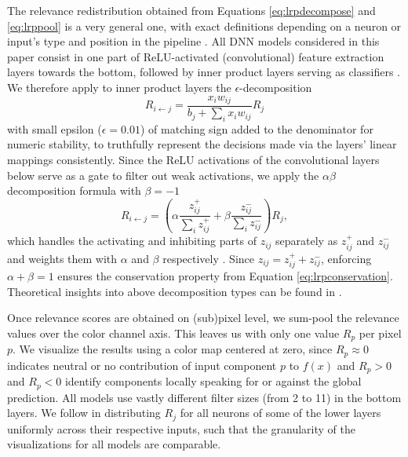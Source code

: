\documentclass[10pt,twocolumn,letterpaper]{article}
\begin{document}
The relevance redistribution obtained from Equations \ref{eq:lrpdecompose} and \ref{eq:lrppool} is a very general one, with exact definitions depending on a neuron or input's type and position in the pipeline \cite{lapuschkin2016analyzing}. All DNN models considered in this paper consist in one part of ReLU-activated (convolutional) feature extraction layers towards the bottom, followed by inner product layers serving as classifiers \cite{NIPS2010_4061}. We therefore apply to inner product layers the $\epsilon$-decomposition
\begin{equation}
R_{i\leftarrow j} = \frac{x_iw_{ij}}{b_j + \sum_i x_iw_{ij}} R_j
\end{equation}
with small epsilon ($\epsilon=0.01$) of matching sign added to the denominator for numeric stability, to truthfully represent the decisions made via the layers' linear mappings consistently. 
Since the ReLU activations of the convolutional layers below serve as a gate to filter out weak activations, we apply the $\alpha\beta$ decomposition formula with $\beta=-1$ \cite{bach2015pixel}
\begin{equation}
R_{i\leftarrow j} = \left(\alpha\frac{z^+_{ij}}{\sum_iz^+_{ij}} + \beta\frac{z^-_{ij}}{\sum_iz^-_{ij}}\right)R_j,
\end{equation}
which handles the activating and inhibiting parts of $z_{ij}$ separately as $z^+_{ij}$ and $z^-_{ij}$ and weights them with $\alpha$ and $\beta$ respectively \cite{bach2015pixel}. Since $z_{ij} = z^+_{ij} + z^-_{ij}$, enforcing $\alpha+\beta=1$ ensures the conservation property from Equation \ref{eq:lrpconservation}. Theoretical insights into above decomposition types can be found in \cite{MonPR17}.

Once relevance scores are obtained on (sub)pixel level, we sum-pool the relevance values over the color channel axis. This leaves us with only one value $R_p$ per pixel $p$. We visualize the results using a color map centered at zero, since $R_p \approx 0$ indicates neutral or no contribution of input component $p$ to $f(x)$ and $R_p > 0$ and $R_p < 0$ identify components locally speaking for or against the global prediction. All models use vastly different filter sizes (from 2 to 11) in the bottom layers. We follow \cite{BacICIP16} in distributing $R_j$ for all neurons of some of the lower layers uniformly across their respective inputs, such that the granularity of the visualizations for all models are comparable.
\end{document}
